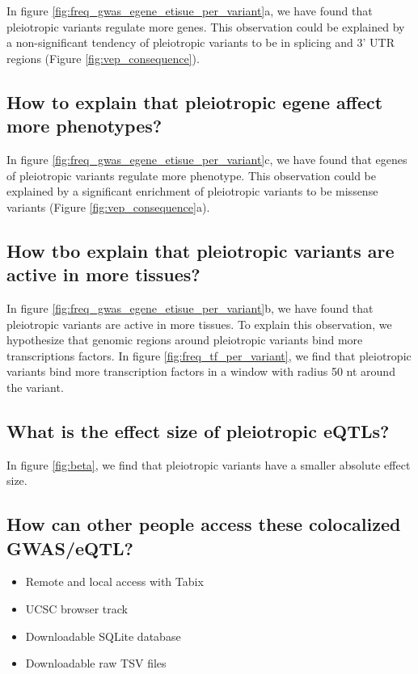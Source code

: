 In figure \ref{fig:freq_gwas_egene_etisue_per_variant}a, we have found that pleiotropic variants regulate more genes.
This observation could be explained by a non-significant tendency of pleiotropic variants to be in splicing and 3' UTR regions (Figure \ref{fig:vep_consequence}).

\subsection*{How to explain that pleiotropic egene affect more phenotypes?}

In figure \ref{fig:freq_gwas_egene_etisue_per_variant}c, we have found that egenes of pleiotropic variants regulate more phenotype.
This observation could be explained by a significant enrichment of pleiotropic variants to be missense variants (Figure \ref{fig:vep_consequence}a).

\subsection*{How tbo explain that pleiotropic variants are active in more tissues?}

In figure \ref{fig:freq_gwas_egene_etisue_per_variant}b, we have found that pleiotropic variants are active in more tissues.
To explain this observation, we hypothesize that genomic regions around pleiotropic variants bind more transcriptions factors.
In figure \ref{fig:freq_tf_per_variant}, we find that pleiotropic variants bind more transcription factors in a window with radius 50 nt around the variant.

\subsection*{What is the effect size of pleiotropic eQTLs?}

In figure \ref{fig:beta}, we find that pleiotropic variants have a smaller absolute effect size.

\subsection*{How can other people access these colocalized GWAS/eQTL?}

\begin{itemize}
  \item Remote and local access with Tabix
  \item UCSC browser track
  \item Downloadable SQLite database
  \item Downloadable raw TSV files
\end{itemize}

